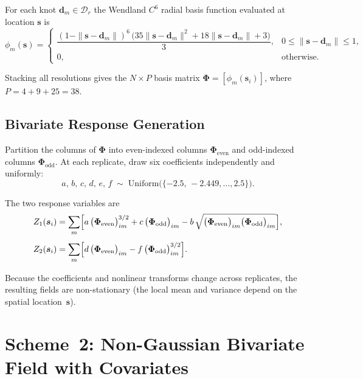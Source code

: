 \documentclass[11pt,a4paper]{article}
\newcommand{\bs}{\bm{s}}
\begin{document}
For each knot $\bm{d}_m \in \mathcal{D}_r$ the Wendland $C^6$ radial basis function
evaluated at location $\bs$ is
\begin{equation}\label{eq:wendland}
  \phi_m(\bs) =
  \begin{cases}
    \dfrac{(1-\|\bs-\bm{d}_m\|)^{6}\,
          \bigl(35\|\bs-\bm{d}_m\|^{2}+18\|\bs-\bm{d}_m\|+3\bigr)}{3},
      & 0 \le \|\bs-\bm{d}_m\| \le 1,\\[6pt]
    0, & \text{otherwise}.
  \end{cases}
\end{equation}

Stacking all resolutions gives the $N\times P$ basis matrix
$\bm{\Phi}=[\phi_m(\bs_i)]$, where $P = 4+9+25 = 38$.

\subsection{Bivariate Response Generation}

Partition the columns of $\bm{\Phi}$ into even-indexed columns
$\bm{\Phi}_{\text{even}}$ and odd-indexed columns $\bm{\Phi}_{\text{odd}}$.
At each replicate, draw six coefficients independently and uniformly:
\[
  a,\,b,\,c,\,d,\,e,\,f \;\sim\; \text{Uniform}\!\bigl(\{-2.5,\,-2.449,\dots,2.5\}\bigr).
\]

The two response variables are
\begin{align}
  Z_1(\bs_i) &= \sum_m \Bigl[
        a\,\bigl(\bm{\Phi}_{\text{even}}\bigr)_{im}^{3/2}
      + c\,\bigl(\bm{\Phi}_{\text{odd}}\bigr)_{im}
      - b\,\sqrt{\bigl(\bm{\Phi}_{\text{even}}\bigr)_{im}
                 \bigl(\bm{\Phi}_{\text{odd}}\bigr)_{im}}
    \Bigr], \label{eq:ns_var1}\\[4pt]
  Z_2(\bs_i) &= \sum_m \Bigl[
        d\,\bigl(\bm{\Phi}_{\text{even}}\bigr)_{im}
      - f\,\bigl(\bm{\Phi}_{\text{odd}}\bigr)_{im}^{3/2}
    \Bigr]. \label{eq:ns_var2}
\end{align}

\noindent
Because the coefficients and nonlinear transforms change across replicates,
the resulting fields are non-stationary (the local mean and variance depend
on the spatial location~$\bs$).

\section{Scheme~2: Non-Gaussian Bivariate Field with Covariates}
\label{sec:ng}
\end{document}
